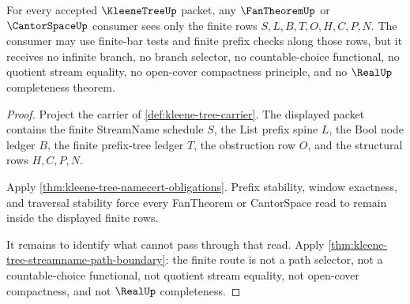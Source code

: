 \begin{theorem}
\label{thm:kleene-tree-fan-boundary}
For every accepted $\KleeneTreeUp$ packet, any $\FanTheoremUp$ or $\CantorSpaceUp$ consumer sees only the finite rows $S,L,B,T,O,H,C,P,N$. The consumer may use finite-bar tests and finite prefix checks along those rows, but it receives no infinite branch, no branch selector, no countable-choice functional, no quotient stream equality, no open-cover compactness principle, and no $\RealUp$ completeness theorem.
\end{theorem}
\begin{proof}
Project the carrier of \autoref{def:kleene-tree-carrier}. The displayed packet contains the finite StreamName schedule $S$, the List prefix spine $L$, the Bool node ledger $B$, the finite prefix-tree ledger $T$, the obstruction row $O$, and the structural rows $H,C,P,N$.

Apply \autoref{thm:kleene-tree-namecert-obligations}. Prefix stability, window exactness, and traversal stability force every FanTheorem or CantorSpace read to remain inside the displayed finite rows.

It remains to identify what cannot pass through that read. Apply \autoref{thm:kleene-tree-streamname-path-boundary}: the finite route is not a path selector, not a countable-choice functional, not quotient stream equality, not open-cover compactness, and not $\RealUp$ completeness.
\end{proof}

